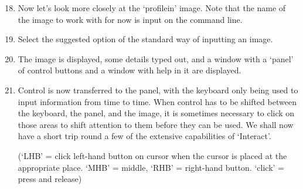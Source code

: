 {\small 
\begin{enumerate}
\setcounter{enumi}{17}
 
\item Now let's look more closely at the `profile{\undersc}in' image.
      Note that the name of the image to work with for now is
      input on the command line.
 
\item Select the suggested option of the standard way of inputting an
      image.
 
\item The image is displayed, some details typed out, and a window with
      a `panel' of control buttons and a window with help in it are
      displayed.
 
\item Control is now transferred to the panel, with the keyboard only
      being used to input information from time to time. When control has
      to be shifted between the keyboard, the panel, and the image, it is
      sometimes necessary to click on those areas to shift attention to
      them before they can be used. We shall now have a short trip round
      a few of the extensive capabilities of `Interact'.
 
      (`LHB' = click left-hand button on cursor when the
        cursor is placed at the  appropriate place. `MHB' = middle, `RHB'
        = right-hand button. `click' = press and release)
 

\end{enumerate}}
